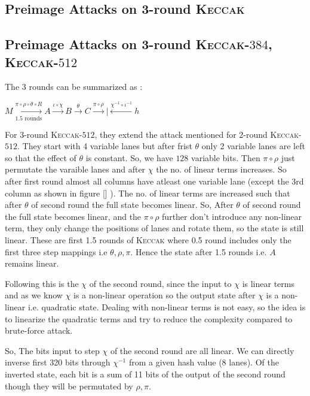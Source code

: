 \documentclass[runningheads]{llncs}
\newcommand{\KECCAK}{\mbox{\textsc{Keccak}}}
\begin{document}
\subsection{Preimage Attacks on 3-round \KECCAK}
\subsection{Preimage Attacks on 3-round \KECCAK-$384$, \KECCAK-$512$}

		The 3 rounds can be summarized as :
    
    $ M \xrightarrow[\text{1.5 rounds}]{ \pi \circ \rho \circ \theta \circ R} A \xrightarrow[]{ \iota \circ \chi } B \xrightarrow[]{ \theta } C \xrightarrow[]{ \pi \circ \rho } | \xleftarrow[]{ \chi^{-1} \circ \iota^{-1} } h  $

		For 3-round \KECCAK-$512$, they extend the attack mentioned for 2-round \KECCAK-$512$. They start with 4 variable lanes but after frist $\theta$ only 2 variable lanes are left so that the effect of $\theta$ is constant. So, we have $128$ variable bits. Then $\pi \circ \rho$ just permutate the varaible lanes and after $\chi$ the no. of linear terms increases. So after first round almost all columns have atleast one variable lane (except the 3rd column as shown in figure [] ). The no. of linear terms are increased such that after $\theta$ of second round the full state becomes linear. So, After $\theta$ of second round the full state becomes linear, and the $\pi \circ \rho$ further don't introduce any non-linear term, they only change the positions of lanes and rotate them, so the state is still linear.  These are first 1.5 rounds of \KECCAK{} where 0.5 round includes only the first three step mappings i.e $\theta, \rho, \pi$. Hence the state after 1.5 rounds i.e. $A$ remains linear.
		
		Following this is the $\chi$ of the second round, since the input to $\chi$ is linear terms and as we know $\chi$ is a non-linear operation so the output state after $\chi$ is a non-linear i.e. quadratic state. Dealing with non-linear terms is not easy, so the idea is to linearize the quadratic terms and try to reduce the complexity compared to brute-force attack.

		So, The bits input to step $\chi$ of the second round are all linear. We can directly inverse first 320 bits through $\chi^{-1}$ from a given hash value (8 lanes). Of the inverted state, each bit is a sum of 11 bits of the output of the second round though they will be permutated by $\rho, \pi$.
\end{document}
